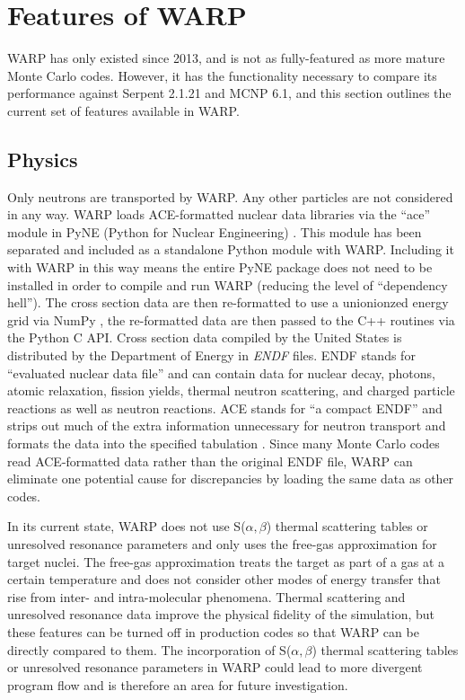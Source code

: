\documentclass[preprint,12pt]{elsarticle}
\begin{document}
\section{Features of WARP}
\label{sec:features}

WARP has only existed since 2013, and is not as fully-featured as more mature Monte Carlo codes.  However, it has the functionality necessary to compare its performance against Serpent 2.1.21 and MCNP 6.1, and this section outlines the current set of features available in WARP.  

\subsection{Physics}

Only neutrons are transported by WARP.  Any other particles are not considered in any way.  WARP loads ACE-formatted nuclear data libraries via the ``ace'' module in PyNE (Python for Nuclear Engineering) \cite{pyne}.  This module has been separated and included as a standalone Python module with WARP.  Including it with WARP in this way means the entire PyNE package does not need to be installed in order to compile and run WARP (reducing the level of ``dependency hell'').  The cross section data are then re-formatted to use a unionionzed energy grid via NumPy \cite{numpy}, the re-formatted data are then passed to the C++ routines via the Python C API.  Cross section data compiled by the United States is distributed by the Department of Energy in \emph{ENDF} files.  ENDF stands for ``evaluated nuclear data file'' and can contain data for nuclear decay, photons, atomic relaxation, fission yields, thermal neutron scattering, and charged particle reactions as well as neutron reactions.  ACE stands for ``a compact ENDF'' and strips out much of the extra information unnecessary for neutron transport and formats the data into the specified tabulation \cite{endfnums}.  Since many Monte Carlo codes read ACE-formatted data rather than the original ENDF file, WARP can eliminate one potential cause for discrepancies by loading the same data as other codes.  

In its current state, WARP does not use S($\alpha,\beta$) thermal scattering tables or unresolved resonance parameters and only uses the free-gas approximation for target nuclei.  The free-gas approximation treats the target as part of a gas at a certain temperature and does not consider other modes of energy transfer that rise from inter- and intra-molecular phenomena.  Thermal scattering and unresolved resonance data improve the physical fidelity of the simulation, but these features can be turned off in production codes so that WARP can be directly compared to them.  The incorporation of S($\alpha,\beta$) thermal scattering tables or unresolved resonance parameters in WARP could lead to more divergent program flow and is therefore an area for future investigation.
\end{document}
